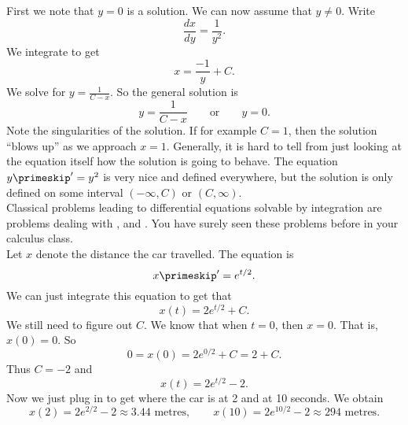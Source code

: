{
First we note that $y=0$ is a solution.  We can now assume that $y \not= 0$.
Write
\begin{equation*}
\frac{dx}{dy} = \frac{1}{y^2} .
\end{equation*}
We integrate to get
\begin{equation*}
x = \frac{-1}{y} + C .
\end{equation*}
We solve for $y = \frac{1}{C-x}$.
So the general solution is
\begin{equation*}
y = \frac{1}{C-x} \qquad \text{or} \qquad y = 0.
\end{equation*}
Note the singularities of the solution.  If for example $C=1$, then the
solution ``blows up'' as we approach $x=1$.  Generally,
it is hard to tell
from just looking at the equation itself how the solution is going to behave.
The equation $y\primeskip ' = y^2$ is very nice and defined everywhere, but
the solution is only defined on some interval $(-\infty, C)$ or
$(C, \infty)$.
}\\

Classical problems leading to differential equations solvable by integration
are problems 
dealing with ,
 and .  You have surely seen these
problems before in your calculus class.\\

{
Let $x$ denote the distance the car travelled.
The equation is
\begin{equation*}
x\primeskip' = e^{t/2} .
\end{equation*}
We can just integrate this equation to get that
\begin{equation*}
x(t) = 2 e^{t/2} + C . 
\end{equation*}
We still need to figure out $C$.  We know that when $t=0$, then
$x=0$.  That is, $x(0) = 0$.  So
\begin{equation*}
0 = x(0) = 2e^{0/2} + C = 2 + C .
\end{equation*}
Thus $C = -2$ and 
\begin{equation*}
x(t) = 2 e^{t/2} - 2 .
\end{equation*}
Now we just plug in to get where the car is at 2 and at 10 seconds.
We obtain
\begin{equation*}
x(2) = 2e^{2/2} - 2 \approx 3.44 \text{ metres} ,
\qquad
x(10) = 2e^{10/2} - 2 \approx 294 \text{ metres} .
\end{equation*}
}\\

